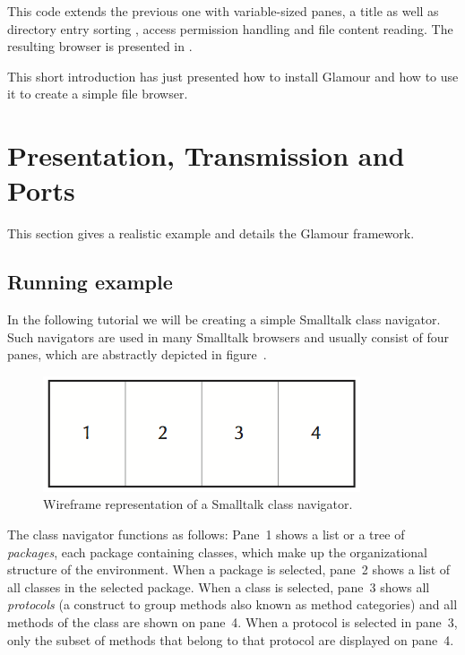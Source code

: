\documentclass[a4paper,10pt,twoside]{book}
\begin{document}
This code extends the previous one with variable-sized panes, a title
as well as directory entry sorting , access permission handling and
file content reading. The resulting browser is presented in
.

This short introduction has just presented how to install Glamour and how to use
it to create a simple file browser. 

\section{Presentation, Transmission and Ports}

This section gives a realistic example and details the Glamour framework.

\subsection{Running example}
\label{sec:tutorial/getting_started}

In the following tutorial we will be creating a simple Smalltalk class
navigator. Such navigators are used in many Smalltalk browsers and
usually consist of four panes, which are abstractly depicted in
figure~.

\begin{figure}[htbp]
\centerline{\includegraphics[width=\linewidth]{classnavigator_wireframe.png}}
\caption{Wireframe representation of a Smalltalk class navigator.}
\label{fig:classnavigator_wireframe}
\end{figure}

The class navigator functions as follows: Pane~1 shows a list or a
tree of \emph{packages}, each package containing classes, which make up the
organizational structure of the environment. When a package is
selected, pane~2 shows a list of all classes in the selected
package. When a class is selected, pane~3 shows all \emph{protocols}
(a construct to group methods also known as method categories) and all
methods of the class are shown on pane~4. When a protocol is
selected in pane~3, only the subset of methods that belong to that
protocol are displayed on pane~4.
\end{document}
